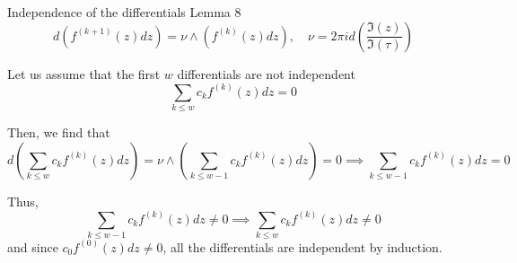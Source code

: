 \documentclass[11pt,aspectratio=169]{beamer}
\begin{document}
\begin{frame}{Independence of the differentials}{\tiny \cite{BL13} Lemma 8}
    \[d(f^{(k+1)}(z)dz) = \nu \wedge (f^{(k)}(z)dz), \quad \nu = 2\pi i d\left(\frac{\Im(z)}{\Im(\tau)}\right)\]

    \pause{}

    Let us assume that the first $w$ differentials are not independent
    \[\sum_{k\leq w} c_{k} f^{(k)}(z) dz = 0\]

    \pause{}

    Then, we find that
    \[ d\left(\sum_{k\leq w} c_{k} f^{(k)}(z) dz\right) = \nu \wedge \left(\sum_{k\leq w-1} c_{k} f^{(k)}(z) dz\right) = 0 \implies \sum_{k\leq w-1} c_{k} f^{(k)}(z) dz = 0 \]

    \pause{}

    Thus,
    \[\sum_{k\leq w-1} c_{k} f^{(k)}(z) dz \neq 0 \implies \sum_{k\leq w} c_{k} f^{(k)}(z) dz \neq 0\]
    and since $c_0 f^{(0)}(z) dz \neq 0$, all the differentials are independent by induction.
\end{frame}
\end{document}
